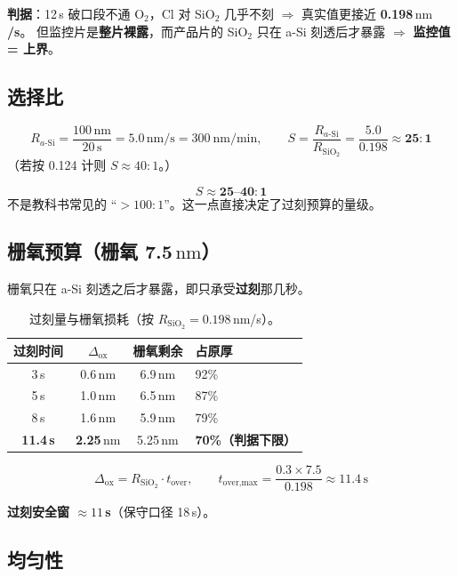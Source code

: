 \documentclass[UTF8,a4paper,11pt,fontset=windows]{ctexart}
\newcommand{\nm}{\ensuremath{\,\mathrm{nm}}}
\begin{document}
\textbf{判据}：12\,s 破口段不通 O$_2$，Cl 对 SiO$_2$ 几乎不刻 $\Rightarrow$ 真实值更接近 \textbf{0.198\nm/s}。
但监控片是\textbf{整片裸露}，而产品片的 SiO$_2$ 只在 a-Si 刻透后才暴露 $\Rightarrow$ \textbf{监控值 = 上界}。

\subsection{选择比}

\[
R_{a\text{-}\mathrm{Si}} = \frac{100\nm}{20\,\mathrm{s}} = 5.0\nm/\mathrm{s} = 300\ \text{nm/min},
\qquad
S = \frac{R_{a\text{-}\mathrm{Si}}}{R_{\mathrm{SiO_2}}} = \frac{5.0}{0.198} \approx \mathbf{25{:}1}
\]
（若按 0.124 计则 $S\approx 40{:}1$。）

\begin{keybox}[结论]
\[ S \approx \mathbf{25\text{--}40\!:\!1} \]
不是教科书常见的 “$>100{:}1$”。这一点直接决定了过刻预算的量级。
\end{keybox}

\subsection{栅氧预算（栅氧 7.5\nm）}

栅氧只在 a-Si 刻透之后才暴露，即只承受\textbf{过刻}那几秒。

\begin{table}[h]
\centering
\small
\begin{tabular}{@{}cccl@{}}
\toprule
\textbf{过刻时间} & \textbf{$\Delta_{\mathrm{ox}}$} & \textbf{栅氧剩余} & \textbf{占原厚} \\
\midrule
3\,s        & 0.6\nm & 6.9\nm & 92\% \\
5\,s        & 1.0\nm & 6.5\nm & 87\% \\
8\,s        & 1.6\nm & 5.9\nm & 79\% \\
\textbf{11.4\,s} & \textbf{2.25\nm} & 5.25\nm & \textbf{70\%（判据下限）} \\
\bottomrule
\end{tabular}
\caption{过刻量与栅氧损耗（按 $R_{\mathrm{SiO_2}}=0.198\nm$/s）。}
\end{table}

\[
\Delta_{\mathrm{ox}} = R_{\mathrm{SiO_2}}\cdot t_{\text{over}},\qquad
t_{\text{over,max}} = \frac{0.3\times 7.5}{0.198} \approx 11.4\,\mathrm{s}
\]

\textbf{过刻安全窗 $\approx 11$\,s}（保守口径 18\,s）。

\subsection{均匀性}
\end{document}
